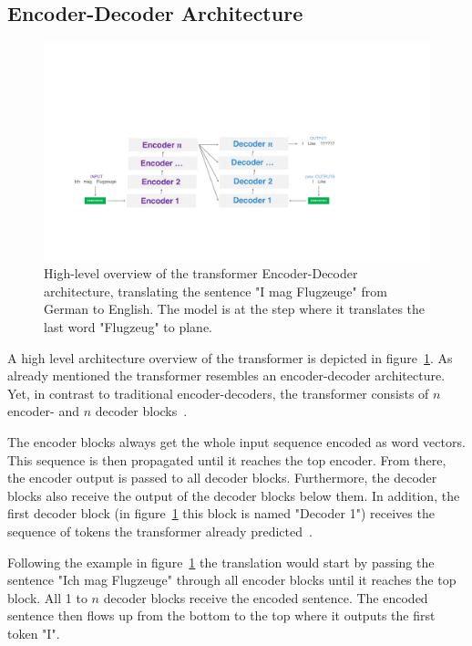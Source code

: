 \subsection{Encoder-Decoder Architecture}

\begin{figure}[htp]
	\centering
	\includegraphics[width=\textwidth]{figures/03_theory/03_transformer_Architecture_HighLevel}
	\caption{High-level overview of the transformer Encoder-Decoder architecture, translating the sentence "I mag Flugzeuge" from German to English. The model is at the step where it translates the last word "Flugzeug" to plane.}
	\label{fig:03_transformer_HighlevelOverview}
\end{figure}

A high level architecture overview of the transformer is depicted in figure~\ref{fig:03_transformer_HighlevelOverview}. As already mentioned the transformer resembles an encoder-decoder architecture. Yet, in contrast to traditional encoder-decoders, the transformer consists of $n$ encoder- and $n$ decoder blocks~\cite{Vaswani2017d}. 
\medskip

The encoder blocks always get the whole input sequence encoded as word vectors. This sequence is then propagated until it reaches the top encoder. From there, the encoder output is passed to all decoder blocks. Furthermore, the decoder blocks also receive the output of the decoder blocks below them. In addition, the first decoder block {(in figure~\ref{fig:03_transformer_HighlevelOverview} this block is named "Decoder 1")} receives the sequence of tokens the transformer already predicted~\cite{Vaswani2017d}. 
\medskip

Following the example in figure~\ref{fig:03_transformer_HighlevelOverview} the translation would start by passing the sentence "Ich mag Flugzeuge" through all encoder blocks until it reaches the top block. All 1 to $n$ decoder blocks receive the encoded sentence. The encoded sentence then flows up from the bottom to the top where it outputs the first token "I". 

